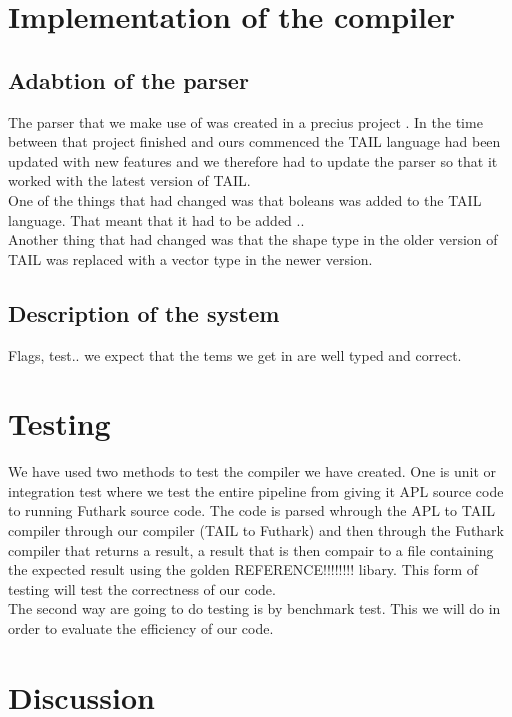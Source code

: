 \documentclass[11pt]{article}
\begin{document}
\section{Implementation of the compiler}

\subsection{Adabtion of the parser}
The parser that we make use of was created in a precius project \cite{APLACC}. In the time between that project finished and ours commenced the TAIL language had been updated with new features and we therefore had to update the parser so that it worked with the latest version of TAIL.\\

One of the things that had changed was that boleans was added to the TAIL language. That meant that it had to be added ..\\

Another thing that had changed was that the shape type in the older version of TAIL was replaced with a vector type in the newer version.\\

\subsection{Description of the system}
Flags, test..
we expect that the tems we get in are well typed and correct. 

\section{Testing}
We have used two methods to test the compiler we have created. One is unit or integration test where we test the entire pipeline from giving it APL source code to running Futhark source code. The code is parsed whrough the APL to TAIL compiler \cite{ElsmanDybdal:Array:2014} through our compiler (TAIL to Futhark) and then through the Futhark compiler \cite{TroelsHenriksen} that returns a result, a result that is then compair to a file containing the expected result using the golden REFERENCE!!!!!!!! %
libary. This form of testing will test the correctness of our code. \\

The second way are going to do testing is by benchmark test. This we will do in order to evaluate the efficiency of our code. 

\section{Discussion}
\end{document}

